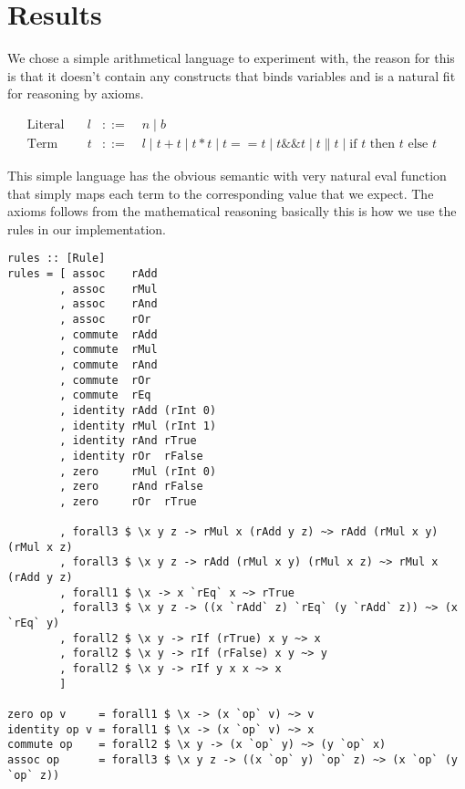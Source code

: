 
\newcommand{\defBNF}[4] {\text{#1}\quad&#2&::=&\;#3&\text{#4}}
\newcommand{\defaltBNF}[2] {&&|&\;#1&\text{#2}}
\newcommand{\sepBNF}{\;|\;} 
\section{Results}

We chose a simple arithmetical language to experiment with, the reason for this
is that it doesn't contain any constructs that binds variables and is a natural
fit for reasoning by axioms.


\begin{equation*}
\begin{aligned}
\defBNF{Literal}{l}{n \sepBNF b}{} \\
\defBNF{Term}{t}{l \sepBNF t + t \sepBNF t * t \sepBNF t == t \sepBNF t \&\& t
                 \sepBNF t \| t \sepBNF \text{if } t \text{ then } t \text{ else } t
                 }{} 
\end{aligned}
\end{equation*}

This simple language has the obvious semantic with very natural eval function
that simply maps each term to the corresponding value that we expect. The axioms
follows from the mathematical reasoning basically this is how we use the rules
in our implementation.

\begin{verbatim}
rules :: [Rule]
rules = [ assoc    rAdd
        , assoc    rMul
        , assoc    rAnd
        , assoc    rOr
        , commute  rAdd
        , commute  rMul
        , commute  rAnd
        , commute  rOr
        , commute  rEq
        , identity rAdd (rInt 0)
        , identity rMul (rInt 1)
        , identity rAnd rTrue
        , identity rOr  rFalse
        , zero     rMul (rInt 0)
        , zero     rAnd rFalse
        , zero     rOr  rTrue

        , forall3 $ \x y z -> rMul x (rAdd y z) ~> rAdd (rMul x y) (rMul x z)
        , forall3 $ \x y z -> rAdd (rMul x y) (rMul x z) ~> rMul x (rAdd y z)
        , forall1 $ \x -> x `rEq` x ~> rTrue
        , forall3 $ \x y z -> ((x `rAdd` z) `rEq` (y `rAdd` z)) ~> (x `rEq` y)
        , forall2 $ \x y -> rIf (rTrue) x y ~> x
        , forall2 $ \x y -> rIf (rFalse) x y ~> y
        , forall2 $ \x y -> rIf y x x ~> x
        ]

zero op v     = forall1 $ \x -> (x `op` v) ~> v
identity op v = forall1 $ \x -> (x `op` v) ~> x
commute op    = forall2 $ \x y -> (x `op` y) ~> (y `op` x)
assoc op      = forall3 $ \x y z -> ((x `op` y) `op` z) ~> (x `op` (y `op` z))
\end{verbatim}

